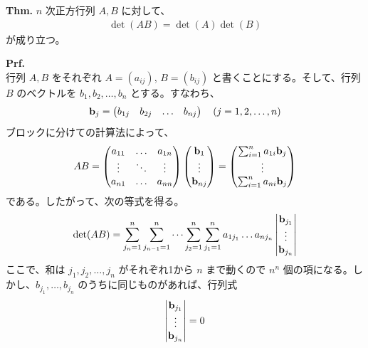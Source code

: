 \documentclass[a4paper,11pt]{jsarticle}
\numberwithin{equation}{section}
\begin{document}
\begin{itembox}[l]{\textbf{Thm.}}
  $n$ 次正方行列 $A, B$ に対して、
  \begin{align}
      \det(AB) = \det(A) \det(B)
  \end{align}
  が成り立つ。
\end{itembox}
\textbf{Prf.}\\
 行列 $A, B$ をそれぞれ $A = (a_{ij})$, $B = (b_{ij})$ と書くことにする。そして、行列 $B$ のベクトルを $b_1, b_2, \dots, b_n$ とする。すなわち、
\begin{align}
  \vb{b}_j = 
  \begin{pmatrix}
      b_{1j} & b_{2j} & \dots & b_{nj}
  \end{pmatrix}
  \quad (j = 1, 2, \dots, n)
\end{align}
ブロックに分けての計算法によって、
\begin{align}
  AB =
  \begin{pmatrix}
      a_{11} & \dots & a_{1n} \\
      \vdots & \ddots & \vdots \\
      a_{n1} & \dots & a_{nn}
  \end{pmatrix}
  \begin{pmatrix}
      \vb{b}_{1} \\
      \vdots \\
      \vb{b}_{nj}
  \end{pmatrix}
  =
  \begin{pmatrix}
      \sum_{i=1}^{n} a_{1i}\vb{b}_{j} \\
      \vdots \\
      \sum_{i=1}^{n} a_{ni}\vb{b}_{j}
  \end{pmatrix}
\end{align}
である。したがって、次の等式を得る。
\begin{align}
  \det(AB) = \sum_{j_n=1}^{n} \sum_{j_{n-1}=1}^{n} \dots \sum_{j_2 =1}^{n} \sum_{j_1 =1}^{n} a_{1j_1} \dots a_{nj_n} 
  \begin{vmatrix}
      \vb{b}_{j_1} \\
      \vdots \\
      \vb{b}_{j_n}
  \end{vmatrix}
\end{align}
ここで、和は $j_1, j_2, \dots, j_n$ がそれぞれ1から $n$ まで動くので $n^n$ 個の項になる。しかし、$b_{j_1}, \dots, b_{j_n}$ のうちに同じものがあれば、行列式
\begin{align}
  \begin{vmatrix}
      \vb{b}_{j_1} \\
      \vdots \\
      \vb{b}_{j_n}
  \end{vmatrix} = 0
\end{align}
\end{document}
